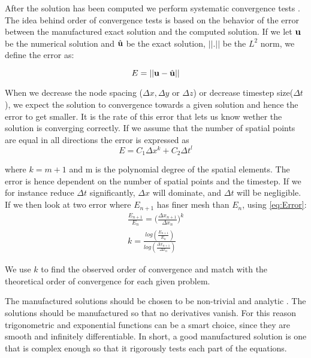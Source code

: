 After the solution has been computed we perform systematic convergence tests \cite{Roache2002}. The idea behind order of convergence tests is based on the behavior of the error between the manufactured exact solution and the computed solution. 
If we let $\bold{u}$ be the numerical solution and $\hat{\bold{u}}$ be the exact solution, $|| . ||$ be the $L^2$ norm, we define the error as:

\begin{equation}
E = || \bold{u} - \hat{\bold{u}} ||
\end{equation}

When we decrease the node spacing ($ \Delta x, \Delta y$ or $ \Delta z$) or decrease timestep size($\Delta t$), we expect the solution to convergence towards a given solution and hence the error to get smaller. It is the rate of this error that lets us know wether the solution is converging correctly.
If we assume that the number of spatial points are equal in all directions the error is expressed as
\begin{equation}
\label{eq:Error}
 E = C_1 \Delta x^k+ C_2 \Delta t^l 
\end{equation}

where $ k = m+1 $ and m is the polynomial degree of the spatial elements. The error is hence dependent on the number of spatial points and the timestep.
If we for instance reduce $\Delta t$ significantly, $\Delta x$ will dominate, and $\Delta t$ will be negligible. If we then look at two error where $E_{n+1}$ has finer mesh than $E_n$, using \eqref{eq:Error}:
\begin{align}
\frac{E_{n+1}}{E_n} = \big( \frac{\Delta x_{n+1}}{\Delta x_n} \big)^k \\
k = \frac{log( \frac{E_{n+1}}{E_n}) }{ log(\frac{\Delta x_{n+1}}{\Delta x_n})}
\end{align}

We use $k$ to find the observed order of convergence and match with the theoretical order of convergence for each given problem.\newline

The manufactured solutions should be chosen to be non-trivial and analytic \cite{Oberkampf2010, Roache2002}. The solutions should be manufactured so that no derivatives vanish. For this reason trigonometric and exponential functions can be a smart choice, since they are smooth and infinitely differentiable. In short, a good manufactured solution is one that is complex enough so that it rigorously tests each part of the equations.\newline 

